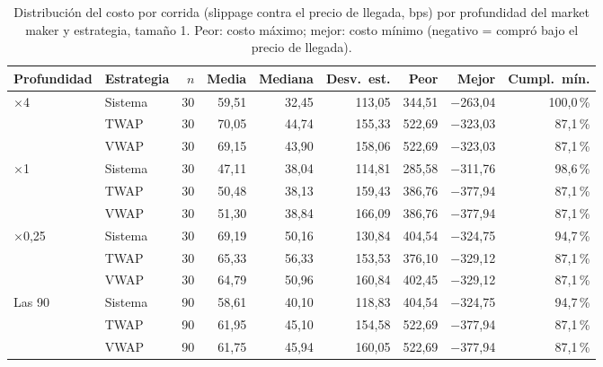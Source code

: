 \begin{table}[htbp]
\centering
\small
\caption{Distribución del costo por corrida (slippage contra el precio de llegada, bps) por profundidad del market maker y estrategia, tamaño 1. Peor: costo máximo; mejor: costo mínimo (negativo = compró bajo el precio de llegada).}
\label{tab:distribucion_costo}
\begin{tabular}{llrrrrrrr}
\hline
Profundidad & Estrategia & $n$ & Media & Mediana & Desv.\ est. & Peor & Mejor & Cumpl.\ mín. \\
\hline
$\times$4 & Sistema & 30 & 59,51 & 32,45 & 113,05 & 344,51 & $-$263,04 & 100,0\,\% \\
 & TWAP & 30 & 70,05 & 44,74 & 155,33 & 522,69 & $-$323,03 & 87,1\,\% \\
 & VWAP & 30 & 69,15 & 43,90 & 158,06 & 522,69 & $-$323,03 & 87,1\,\% \\
\hline
$\times$1 & Sistema & 30 & 47,11 & 38,04 & 114,81 & 285,58 & $-$311,76 & 98,6\,\% \\
 & TWAP & 30 & 50,48 & 38,13 & 159,43 & 386,76 & $-$377,94 & 87,1\,\% \\
 & VWAP & 30 & 51,30 & 38,84 & 166,09 & 386,76 & $-$377,94 & 87,1\,\% \\
\hline
$\times$0,25 & Sistema & 30 & 69,19 & 50,16 & 130,84 & 404,54 & $-$324,75 & 94,7\,\% \\
 & TWAP & 30 & 65,33 & 56,33 & 153,53 & 376,10 & $-$329,12 & 87,1\,\% \\
 & VWAP & 30 & 64,79 & 50,96 & 160,84 & 402,45 & $-$329,12 & 87,1\,\% \\
\hline
Las 90 & Sistema & 90 & 58,61 & 40,10 & 118,83 & 404,54 & $-$324,75 & 94,7\,\% \\
 & TWAP & 90 & 61,95 & 45,10 & 154,58 & 522,69 & $-$377,94 & 87,1\,\% \\
 & VWAP & 90 & 61,75 & 45,94 & 160,05 & 522,69 & $-$377,94 & 87,1\,\% \\
\hline
\end{tabular}
\end{table}
